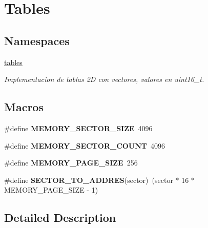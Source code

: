 \hypertarget{group__Tables}{}\section{Tables}
\label{group__Tables}
\subsection*{Namespaces}
\begin{DoxyCompactItemize}
\item 
 \hyperlink{namespacetables}{tables}
\begin{DoxyCompactList}\small\item\em Implementacion de tablas 2D con vectores, valores en uint16\+\_\+t. \end{DoxyCompactList}\end{DoxyCompactItemize}
\subsection*{Macros}
\begin{DoxyCompactItemize}
\item 
\mbox{\label{group__Tables_ga04fa27dc99bae1e676fd6a65695ab272}} 
\#define {\bfseries M\+E\+M\+O\+R\+Y\+\_\+\+S\+E\+C\+T\+O\+R\+\_\+\+S\+I\+ZE}~4096
\item 
\mbox{\label{group__Tables_ga9544ad8232a908fb374ab10dc85044ea}} 
\#define {\bfseries M\+E\+M\+O\+R\+Y\+\_\+\+S\+E\+C\+T\+O\+R\+\_\+\+C\+O\+U\+NT}~4096
\item 
\mbox{\label{group__Tables_gacec51ea00872290be9953f8a76ba1e2b}} 
\#define {\bfseries M\+E\+M\+O\+R\+Y\+\_\+\+P\+A\+G\+E\+\_\+\+S\+I\+ZE}~256
\item 
\mbox{\label{group__Tables_ga79ab0f4b5245b5d5450e444591d470b2}} 
\#define {\bfseries S\+E\+C\+T\+O\+R\+\_\+\+T\+O\+\_\+\+A\+D\+D\+R\+ES}(sector)~(sector $\ast$ 16 $\ast$ M\+E\+M\+O\+R\+Y\+\_\+\+P\+A\+G\+E\+\_\+\+S\+I\+ZE -\/ 1)
\end{DoxyCompactItemize}


\subsection{Detailed Description}
